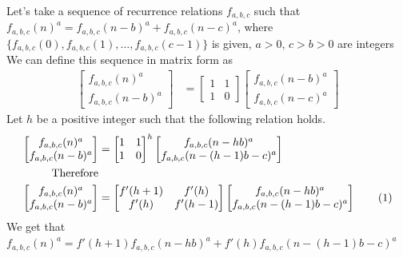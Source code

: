 \documentclass[preprint,12pt]{elsarticle}
\begin{document}
Let's take a sequence of recurrence relations $f_{a,b,c}$ such that\\ $f_{a,b,c}(n)^a = f_{a,b,c}(n - b)^a+f_{a,b,c}(n - c)^a$, where $\{f_{a,b,c}(0), f_{a,b,c}(1), \ldots, f_{a,b,c}(c - 1)\}$ is given, $a > 0$, $c > b > 0$ are integers \\
We can define this sequence in matrix form as
\begin{align*}
	\begin{bmatrix}f_{a,b,c}(n)^a \\f_{a,b,c}(n - b)^a\end{bmatrix} 
	&=
	\begin{bmatrix}1 & 1 \\1 & 0\end{bmatrix}
	\begin{bmatrix}f_{a,b,c}(n - b)^a\\f_{a,b,c}(n - c)^a\end{bmatrix}
\end{align*}
Let $h$ be a positive integer such that the following relation holds.
\begin{align*}
	\begin{bmatrix}f_{a,b,c}(n)^a \\f_{a,b,c}(n - b)^a\end{bmatrix}
	&=
	\begin{bmatrix}1       & 1     \\1 & 0\end{bmatrix}^h
	\begin{bmatrix}f_{a,b,c}(n - hb)^a\\f_{a,b,c}(n-(h-1)b - c)^a\end{bmatrix}\\
	\text{Therefore}\\
	\begin{bmatrix}f_{a,b,c}(n)^a \\f_{a,b,c}(n - b)^a\end{bmatrix}
	&=
	\begin{bmatrix}f'(h+1) & f'(h) \\f'(h) & f'(h-1)\end{bmatrix}
	\begin{bmatrix}f_{a,b,c}(n - hb)^a\\f_{a,b,c}(n-(h-1)b - c)^a\end{bmatrix}
	\stepcounter{equation}\tag{\theequation}\label{myeq1}\\
\end{align*}
We get that $f_{a,b,c}(n)^a = f'(h+1)f_{a,b,c}(n-hb)^a + f'(h)f_{a,b,c}(n-(h-1)b-c)^a$
\end{document}
